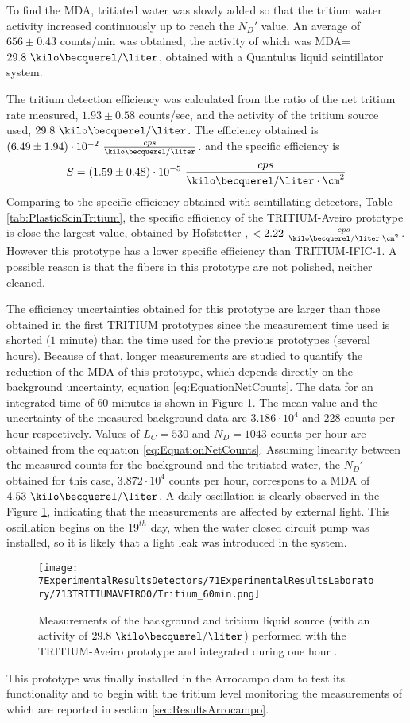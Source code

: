To find the MDA, tritiated water was slowly added  so that the tritium water activity increased continuously up to reach the $N_D'$ value. An average of $656 \pm 0.43$ counts/min was obtained, the activity of which was MDA=$29.8~\kilo\becquerel/\liter$, obtained with a Quantulus liquid scintillator system.

The tritium detection efficiency was calculated from the ratio of the net tritium rate measured, $1.93 \pm 0.58$ counts/sec, and the activity of the tritium source used, $29.8~\kilo\becquerel/\liter$. The efficiency obtained is $(6.49 \pm 1.94)\cdot{} 10^{-2}~\frac{cps}{\kilo\becquerel/\liter}$.  and the specific efficiency is
$$S=(1.59 \pm 0.48)\cdot{} 10^{-5}~\frac{cps}{\kilo\becquerel/\liter \cdot{} \cm^{2}}$$ 
Comparing to the specific efficiency obtained with scintillating detectors, Table \ref{tab:PlasticScinTritium}, the specific efficiency of the TRITIUM-Aveiro prototype is close the largest value, obtained by Hofstetter \cite{Hofstetter1, Hofstetter2}, $<2.22~\frac{cps}{\kilo\becquerel/\liter \cdot{} \cm^{2}}$. However this prototype has a lower specific efficiency than TRITIUM-IFIC-1. A possible reason is that the fibers in this prototype are not polished, neither cleaned. 

The efficiency uncertainties obtained for this prototype are larger than those obtained in the first TRITIUM prototypes since the measurement time used is shorted ($1$ minute) than the time used for the previous prototypes (several hours). Because of that, longer measurements are studied to quantify the reduction of the MDA of this prototype, which depends directly on the background uncertainty, equation \ref{eq:EquationNetCounts}. The data for an integrated time of $60$ minutes is shown in Figure \ref{fig:Tritium60min}. The mean value and the uncertainty of the measured background data are $3.186 \cdot{} 10^{4}$ and $228$ counts per hour respectively. Values of $L_C=530$ and $N_D=1043$ counts per hour are obtained from the equation \ref{eq:EquationNetCounts}. Assuming linearity between the measured counts for the background and the tritiated water, the $N_D'$ obtained for this case, $3.872\cdot{}10^4$ counts per hour,  correspons to a MDA of $4.53~\kilo\becquerel/\liter$. A daily oscillation is clearly observed in the Figure \ref{fig:Tritium60min}, indicating that the measurements are affected by external light. This oscillation begins on the $19^{th}$ day, when the water closed circuit pump was installed, so it is likely that a light leak was introduced in the system.

\begin{figure}[h]
\centering
\texttt{[image: 7ExperimentalResultsDetectors/71ExperimentalResultsLaboratory/713TRITIUMAVEIRO0/Tritium\_60min.png]}
\caption{Measurements of the background and tritium liquid source (with an activity of $29.8~\kilo\becquerel/\liter$) performed with the TRITIUM-Aveiro prototype and integrated during one hour \cite{ExperimentalPaperCarlos}.\label{fig:Tritium60min}}
\end{figure}

This prototype was finally installed in the Arrocampo dam to test its functionality and to begin with the tritium level monitoring the measurements of which are reported in section \ref{sec:ResultsArrocampo}.